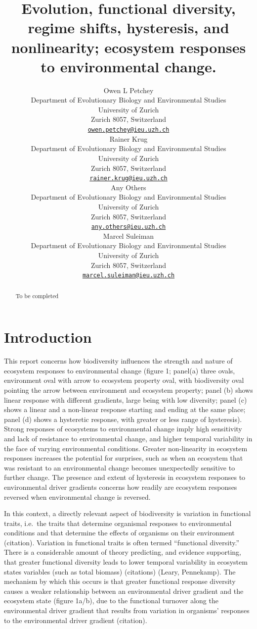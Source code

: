 \documentclass{article}
\title{Evolution, functional diversity, regime shifts, hysteresis, and
nonlinearity; ecosystem responses to environmental change.}
\author{
    Owen L Petchey
   \\
    Department of Evolutionary Biology and Environmental Studies \\
    University of Zurich \\
  Zurich 8057, Switzerland \\
  \texttt{\href{mailto:owen.petchey@ieu.uzh.ch}{\nolinkurl{owen.petchey@ieu.uzh.ch}}} \\
   \And
    Rainer Krug
   \\
    Department of Evolutionary Biology and Environmental Studies \\
    University of Zurich \\
  Zurich 8057, Switzerland \\
  \texttt{\href{mailto:rainer.krug@ieu.uzh.ch}{\nolinkurl{rainer.krug@ieu.uzh.ch}}} \\
   \And
    Any Others
   \\
    Department of Evolutionary Biology and Environmental Studies \\
    University of Zurich \\
  Zurich 8057, Switzerland \\
  \texttt{\href{mailto:any.others@ieu.uzh.ch}{\nolinkurl{any.others@ieu.uzh.ch}}} \\
   \And
    Marcel Suleiman
   \\
    Department of Evolutionary Biology and Environmental Studies \\
    University of Zurich \\
  Zurich 8057, Switzerland \\
  \texttt{\href{mailto:marcel.suleiman@ieu.uzh.ch}{\nolinkurl{marcel.suleiman@ieu.uzh.ch}}} \\
  }
\begin{document}
\maketitle

\def\tightlist{}


\begin{abstract}
To be completed
\end{abstract}


\hypertarget{introduction}{%
\section{Introduction}\label{introduction}}

This report concerns how biodiversity influences the strength and nature
of ecosystem responses to environmental change (figure 1; panel(a) three
ovals, environment oval with arrow to ecosystem property oval, with
biodiversity oval pointing the arrow between environment and ecosystem
property; panel (b) shows linear response with different gradients,
large being with low diversity; panel (c) shows a linear and a
non-linear response starting and ending at the same place; panel (d)
shows a hysteretic response, with greater or less range of hysteresis).
Strong responses of ecosystems to environmental change imply high
sensitivity and lack of resistance to environmental change, and higher
temporal variability in the face of varying environmental conditions.
Greater non-linearity in ecosystem responses increases the potential for
surprises, such as when an ecosystem that was resistant to an
environmental change becomes unexpectedly sensitive to further change.
The presence and extent of hysteresis in ecosystem responses to
environmental driver gradients concerns how readily are ecosystem
responses reversed when environmental change is reversed.

In this context, a directly relevant aspect of biodiversity is variation
in functional traits, i.e.~the traits that determine organismal
responses to environmental conditions and that determine the effects of
organisms on their environment (citation). Variation in functional
traits is often termed ``functional diversity.'' There is a considerable
amount of theory predicting, and evidence supporting, that greater
functional diversity leads to lower temporal variability in ecosystem
states variables (such as total biomass) (citations) (Leary, Pennekamp).
The mechanism by which this occurs is that greater functional response
diversity causes a weaker relationship between an environmental driver
gradient and the ecosystem state (figure 1a/b), due to the functional
turnover along the environmental driver gradient that results from
variation in organisms' responses to the environmental driver gradient
(citation).
\end{document}
